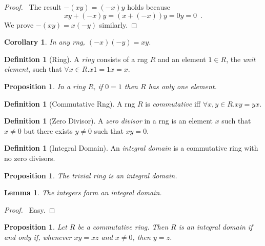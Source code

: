 \documentclass{article}
\let\qed\relax
\newtheorem{lemma}[axiom]{Lemma}
\newtheorem{proposition}[axiom]{Proposition}
\newtheorem{corollary}{Corollary}[axiom]
\theoremstyle{definition}
\newtheorem{definition}[axiom]{Definition}
\begin{document}
    \begin{proof}
        \pf\ The result $-(xy) = (-x)y$ holds because
        \[ xy + (-x)y = (x+(-x))y = 0y = 0 \enspace . \]
        We prove $-(xy) = x(-y)$ similarly. \qed
    \end{proof}

    \begin{corollary}
        In any rng, $(-x)(-y) = xy$.
    \end{corollary}

    \begin{definition}[Ring]
        A \emph{ring} consists of a rng $R$ and an element $1 \in R$, the \emph{unit element},
        such that $\forall x \in R. x1 = 1x = x$.
    \end{definition}

    \begin{proposition}
        In a ring $R$, if $0 = 1$ then $R$ has only one element.
    \end{proposition}

    \begin{definition}[Commutative Rng]
        A rng $R$ is \emph{commutative} iff $\forall x,y \in R. xy = yx$.
    \end{definition}

    \begin{definition}[Zero Divisor]
        A \emph{zero divisor} in a rng is an element $x$ such that $x \neq 0$ but there exists $y \neq 0$ such
        that $xy = 0$.
    \end{definition}

    \begin{definition}[Integral Domain]
        An \emph{integral domain} is a commutative ring with no zero divisors.
    \end{definition}

    \begin{proposition}
        The trivial ring is an integral domain.
    \end{proposition}

    \begin{lemma}
        The integers form an integral domain.
    \end{lemma}

    \begin{proof}
        \pf\ Easy. \qed
    \end{proof}

    \begin{proposition}
        Let $R$ be a commutative ring. Then $R$ is an integral domain if and only if, whenever $xy = xz$
        and $x \neq 0$, then $y = z$.
    \end{proposition}
\end{document}
